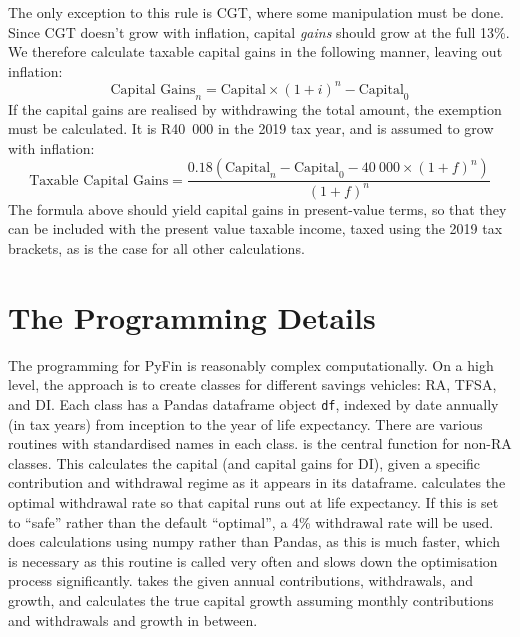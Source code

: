 \documentclass[a4paper, justified]{tufte-handout}
\begin{document}
The only exception to this rule is CGT, where some manipulation must be done. Since CGT doesn't grow with inflation, capital \textit{gains} should grow at the full 13\%. We therefore calculate taxable capital gains in the following manner, leaving out inflation:
\begin{equation}
\textrm{Capital Gains}_{n} = \textrm{Capital}\times(1+i)^{n} - \textrm{Capital}_0
\end{equation}
If the capital gains are realised by withdrawing the total amount, the exemption must be calculated. It is R40~000 in the 2019 tax year, and is assumed to grow with inflation:
\begin{equation}
\textrm{Taxable Capital Gains} = \frac{0.18\left(\textrm{Capital}_{n} - \textrm{Capital}_{0} - 40~000\times(1+f)^{n}\right)}{(1+f)^n}
\end{equation}
The formula above should yield capital gains in present-value terms, so that they can be included with the present value taxable income, taxed using the 2019 tax brackets, as is the case for all other calculations.

\newpage
\section{The Programming Details}
The programming for PyFin is reasonably complex computationally. On a high level, the approach is to create classes for different savings vehicles: RA, TFSA, and DI. Each class has a Pandas dataframe object \texttt{df}, indexed by date annually (in tax years) from inception to the year of life expectancy. There are various routines with standardised names in each class.
 is the central function for non-RA classes. This calculates the capital (and capital gains for DI), given a specific contribution and withdrawal regime as it appears in its dataframe.
 calculates the optimal withdrawal rate so that capital runs out at life expectancy. If this is set to ``safe'' rather than the default ``optimal'', a 4\% withdrawal rate will be used.
 does calculations using numpy rather than Pandas, as this is much faster, which is necessary as this routine is called very often and slows down the optimisation process significantly.
 takes the given annual contributions, withdrawals, and growth, and calculates the true capital growth assuming monthly contributions and withdrawals and growth in between.
\end{document}

